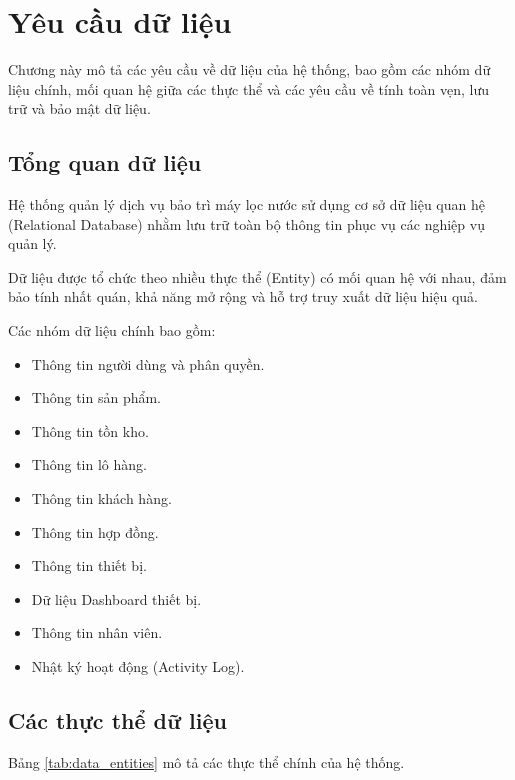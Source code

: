 
\chapter{Yêu cầu dữ liệu}

Chương này mô tả các yêu cầu về dữ liệu của hệ thống, bao gồm các nhóm dữ liệu chính, mối quan hệ giữa các thực thể và các yêu cầu về tính toàn vẹn, lưu trữ và bảo mật dữ liệu.

\section{Tổng quan dữ liệu}

Hệ thống quản lý dịch vụ bảo trì máy lọc nước sử dụng cơ sở dữ liệu quan hệ (Relational Database) nhằm lưu trữ toàn bộ thông tin phục vụ các nghiệp vụ quản lý.

Dữ liệu được tổ chức theo nhiều thực thể (Entity) có mối quan hệ với nhau, đảm bảo tính nhất quán, khả năng mở rộng và hỗ trợ truy xuất dữ liệu hiệu quả.

Các nhóm dữ liệu chính bao gồm:

\begin{itemize}
    \item Thông tin người dùng và phân quyền.
    \item Thông tin sản phẩm.
    \item Thông tin tồn kho.
    \item Thông tin lô hàng.
    \item Thông tin khách hàng.
    \item Thông tin hợp đồng.
    \item Thông tin thiết bị.
    \item Dữ liệu Dashboard thiết bị.
    \item Thông tin nhân viên.
    \item Nhật ký hoạt động (Activity Log).
\end{itemize}

\section{Các thực thể dữ liệu}

Bảng \ref{tab:data_entities} mô tả các thực thể chính của hệ thống.

